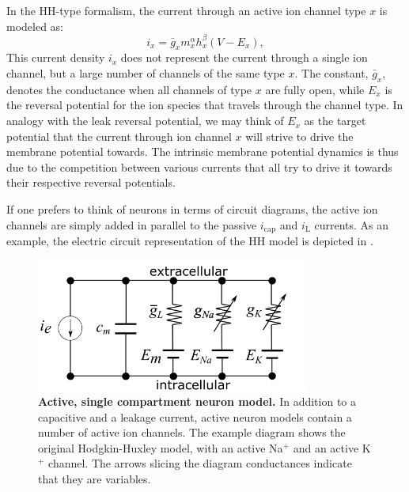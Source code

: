 In the HH-type formalism, the current through an active ion channel type $x$ is modeled as:
\begin{equation}
i_x = \bar{g}_x m_x^{\alpha} h_x^{\beta}(V-E_x), 
\label{eq:Neuron:HHform}
\end{equation}
This current density $i_x$ does not represent the current through a single ion channel, but a large number of channels of the same type $x$. The constant, $\bar{g}_x$, denotes the conductance when all channels of type $x$ are fully open, while $E_x$ is the reversal potential for the ion species that travels through the channel type. In analogy with the leak reversal potential, we may think of $E_x$ as the target potential that the current through ion channel $x$ will strive to drive the membrane potential towards. The intrinsic membrane potential dynamics is thus due to the competition between various currents that all try to drive it towards their respective reversal potentials. 

If one prefers to think of neurons in terms of circuit diagrams, the active ion channels are simply added in parallel to the passive $i_{\mathrm{cap}}$ and $i_{\mathrm{L}}$ currents. As an example, the electric circuit representation of the HH model is depicted in .

\begin{figure}[!ht]
\begin{center}
\includegraphics[width=0.8\textwidth]{Figures/Neuron/HHmodel.png}
\end{center}
\caption[]{\textbf{Active, single compartment neuron model.}  In addition to a capacitive and a leakage current, active neuron models contain a number of active ion channels. The example diagram shows the original Hodgkin-Huxley model, with an active Na$^+$ and an active K$^+$ channel. The arrows slicing the diagram conductances indicate that they are variables.}
\label{fig:Neuron:HH}
\end{figure}


